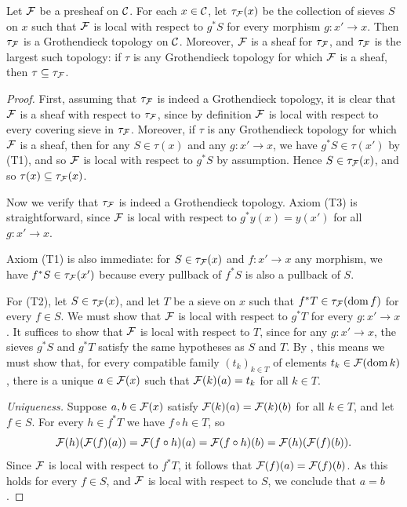 \begin{proposition}\label{prop:chap:sheaves:sec:sites:largest topology for a presheaf}
    Let $\cal{F}$ be a presheaf on $\catC$. For each $x \in \catC$, let $\tau_{\cal{F}}(x)$ be the collection of sieves $S$ on $x$ such that $\cal{F}$ is local with respect to $g^* S$ for every morphism $g : x' \to x$. Then $\tau_{\cal{F}}$ is a Grothendieck topology on $\catC$. Moreover, $\cal{F}$ is a sheaf for $\tau_{\cal{F}}$, and $\tau_{\cal{F}}$ is the largest such topology: if $\tau$ is any Grothendieck topology for which $\cal{F}$ is a sheaf, then $\tau \subseteq \tau_{\cal{F}}$.
\end{proposition}
\begin{proof}
    First, assuming that $\tau_{\cal{F}}$ is indeed a Grothendieck topology, it is clear that $\cal{F}$ is a sheaf with respect to $\tau_{\cal{F}}$, since by definition $\cal{F}$ is local with respect to every covering sieve in $\tau_{\cal{F}}$. Moreover, if $\tau$ is any Grothendieck topology for which $\cal{F}$ is a sheaf, then for any $S \in \tau(x)$ and any $g : x' \to x$, we have $g^* S \in \tau(x')$ by (T1), and so $\cal{F}$ is local with respect to $g^* S$ by assumption. Hence $S \in \tau_{\cal{F}}(x)$, and so $\tau(x) \subseteq \tau_{\cal{F}}(x)$.

    Now we verify that $\tau_{\cal{F}}$ is indeed a Grothendieck topology. Axiom (T3) is straightforward, since $\cal{F}$ is local with respect to $g^* y(x) = y(x')$ for all $g : x' \to x$.

    Axiom (T1) is also immediate: for $S \in \tau_{\cal{F}}(x)$ and $f : x' \to x$ any morphism, we have $f^* S \in \tau_{\cal{F}}(x')$ because every pullback of $f^* S$ is also a pullback of $S$.

    For (T2), let $S \in \tau_{\cal{F}}(x)$, and let $T$ be a sieve on $x$ such that $f^* T \in \tau_{\cal{F}}(\dom f)$ for every $f \in S$. We must show that $\cal{F}$ is local with respect to $g^* T$ for every $g : x' \to x$. It suffices to show that $\cal{F}$ is local with respect to $T$, since for any $g : x' \to x$, the sieves $g^* S$ and $g^* T$ satisfy the same hypotheses as $S$ and $T$. By , this means we must show that, for every compatible family $(t_k)_{k \in T}$ of elements $t_k \in \cal{F}(\dom k)$, there is a unique $a \in \cal{F}(x)$ such that $\cal{F}(k)(a) = t_k$ for all $k \in T$.

    \emph{Uniqueness.} Suppose $a, b \in \cal{F}(x)$ satisfy $\cal{F}(k)(a) = \cal{F}(k)(b)$ for all $k \in T$, and let $f \in S$. For every $h \in f^* T$ we have $f \circ h \in T$, so
    \[\cal{F}(h)(\cal{F}(f)(a)) = \cal{F}(f \circ h)(a) = \cal{F}(f \circ h)(b) = \cal{F}(h)(\cal{F}(f)(b)).\]
    Since $\cal{F}$ is local with respect to $f^* T$, it follows that $\cal{F}(f)(a) = \cal{F}(f)(b)$. As this holds for every $f \in S$, and $\cal{F}$ is local with respect to $S$, we conclude that $a = b$.


\end{proof}
